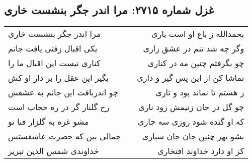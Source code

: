 \begin{center}
\section*{غزل شماره ۲۷۱۵: مرا اندر جگر بنشست خاری}
\label{sec:2715}
\begin{longtable}{l p{0.5cm} r}
مرا اندر جگر بنشست خاری
&&
بحمدالله ز باغ او است باری
\\
یکی اقبال زفتی یافت جانم
&&
وگر چه شد تنم در عشق زاری
\\
کناری نیست این اقبال ما را
&&
چو بگرفتم چنین مه در کناری
\\
بگیر این عقل را بر دار او کش
&&
تماشا کن از این پس گیر و داری
\\
چو اندربافت این جانم به عشقش
&&
ز هستم تا نماند پود و تاری
\\
رخ گلنار گر در ره حجاب است
&&
چو گل در جان زنیمش زود ناری
\\
مشو غره به گلزار فنا تو
&&
که او گنده شود روزی سه چاری
\\
جمالی بین که حضرت عاشقستش
&&
بشو بهر چنین جان جان سپاری
\\
خداوندی شمس الدین تبریز
&&
کز او دارد خداوند افتخاری
\\
\end{longtable}
\end{center}
